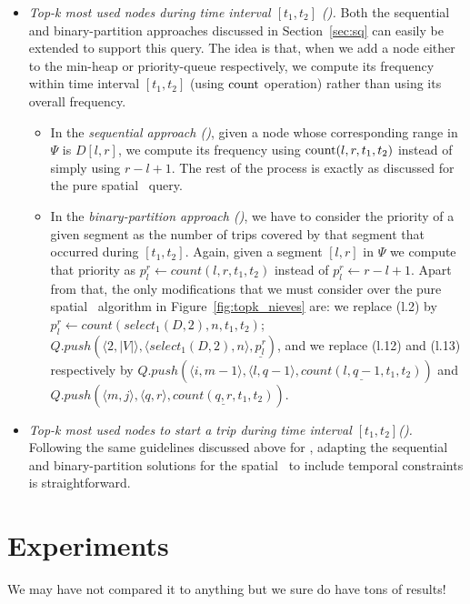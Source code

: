 \begin{itemize}[leftmargin=3mm]
		


	\item {\em Top-k most used nodes during  time interval $[t_1,t_2]$ (\STtk).}
	Both the sequential and binary-partition approaches discussed in Section~\ref{sec:sq} can easily
	be extended to support this query. The idea is that, when we add a node either to the min-heap or priority-queue
	respectively, we compute its frequency within time interval $[t_1,t_2]$ (using $\operatorname{count}$ operation) 
	rather than using its overall frequency.

	\begin{itemize}
		\item In the {\em sequential approach (\Stkseq)}, given a node whose corresponding range
		in $\Psi$ is $D[l,r]$, we compute its frequency using $\operatorname{count}(l,r,t_1,t_2)$ instead of simply using  $r-l+1$. 
		The rest of the process is exactly as discussed for the pure spatial \Stkseq\ query.
		
		\item In the {\em binary-partition approach (\Stkbin)}, we have to consider the priority of a
		given segment as the number of trips covered by that segment that occurred during $[t_1,t_2]$. Again, given
		a segment $[l,r]$ in $\Psi$ we compute that priority as $p_l^r \leftarrow count(l,r,t_1,t_2)$ instead of 
		$p_l^r \leftarrow  r-l+1$. Apart from
		that, the only modifications that we must consider over the pure spatial \Stkbin\ algorithm in 
		Figure~\ref{fig:topk_nieves} are:
		we replace (l.2) by $p_l^r \leftarrow count(select_1(D,2),n,t_1,t_2)$; $Q.push(\langle2, |V|\rangle, \langle select_1(D,2), n\rangle, \underline{p_l^r})$,
		and we replace  (l.12) and (l.13) respectively by 
		   $ Q.push(\langle i, m-1 \rangle, \langle l, q-1 \rangle, \underline{count(l,q-1,t_1,t_2)})$ and
		   $ Q.push(\langle m,   j \rangle, \langle q,   r \rangle, \underline{count(q,r,t_1,t_2)})$.
		
	\end{itemize}


	\item {\em Top-k most used nodes to start a trip during time interval $[t_1,t_2]$(\STtks).}
	Following the same guidelines discussed above for \STtk, adapting the  sequential and 
	binary-partition solutions for the spatial \Stks\ to include temporal constraints is straightforward.	
		
		
	\end{itemize}


\section{Experiments}
	We may have not compared it to anything but we sure do have tons of results!

